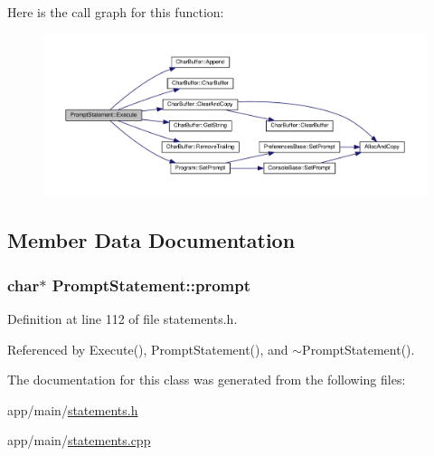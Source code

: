Here is the call graph for this function\+:
\nopagebreak
\begin{figure}[H]
\begin{center}
\leavevmode
\includegraphics[width=350pt]{d9/dd7/classPromptStatement_ad315c8cc58132641e9b8a62902566318_cgraph}
\end{center}
\end{figure}




\subsection{Member Data Documentation}
\subsubsection[{\texorpdfstring{prompt}{prompt}}]{\setlength{\rightskip}{0pt plus 5cm}char$\ast$ Prompt\+Statement\+::prompt\hspace{0.3cm}{\ttfamily [private]}}\hypertarget{classPromptStatement_a9430d327c09b2dfa07b5425c183f8837}{}\label{classPromptStatement_a9430d327c09b2dfa07b5425c183f8837}


Definition at line 112 of file statements.\+h.



Referenced by Execute(), Prompt\+Statement(), and $\sim$\+Prompt\+Statement().



The documentation for this class was generated from the following files\+:\begin{DoxyCompactItemize}
\item 
app/main/\hyperlink{statements_8h}{statements.\+h}\item 
app/main/\hyperlink{statements_8cpp}{statements.\+cpp}\end{DoxyCompactItemize}
